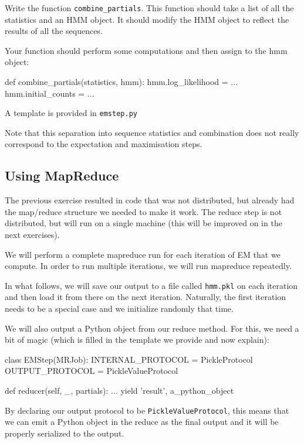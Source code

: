 \begin{exercise}
Write the function \verb+combine_partials+. This function should take a list of all
the statistics and an HMM object. It should modify the HMM object to reflect
the results of all the sequences.

Your function should perform some computations and then assign to the hmm object:

\begin{python}
def combine_partials(statistics, hmm):
    hmm.log_likelihood = ...
    hmm.initial_counts = ...
\end{python}

A template is provided in \verb+emstep.py+
\end{exercise}

Note that this separation into sequence statistics and combination does not
really correspond to the expectation and maximisation steps.

\subsection{Using MapReduce}
The previous exercise resulted in code that was not distributed, but already
had the map/reduce structure we needed to make it work. The reduce step is not
distributed, but will run on a single machine (this will be improved on in the
next exercises).

We will perform a complete mapreduce run for each iteration of EM that we
compute. In order to run multiple iterations, we will run mapreduce repeatedly.

In what follows, we will save our output to a file called \verb+hmm.pkl+ on
each iteration and then load it from there on the next iteration. Naturally,
the first iteration needs to be a special case and we initialize randomly that
time.

We will also output a Python object from our reduce method. For this, we need a
bit of magic (which is filled in the template we provide and now explain):

\begin{python}
class EMStep(MRJob):
    INTERNAL_PROTOCOL   = PickleProtocol
    OUTPUT_PROTOCOL     = PickleValueProtocol

    def reducer(self, _, partials):
        ...
        yield 'result', a_python_object
\end{python}

By declaring our output protocol to be \verb+PickleValueProtocol+, this means
that we can emit a Python object in the reduce as the final output and it will
be properly serialized to the output.

